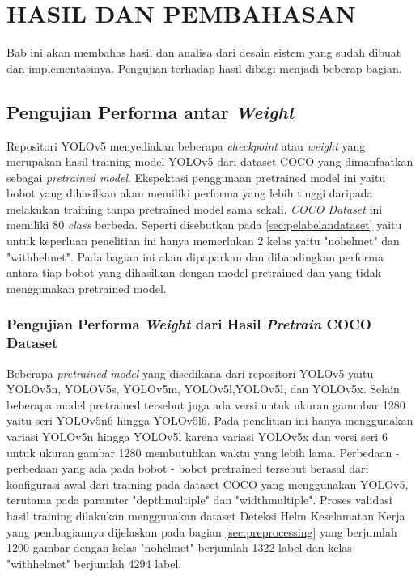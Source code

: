 \chapter{HASIL DAN PEMBAHASAN}
\label{chap:hasilpembahasan}


Bab ini akan membahas hasil dan analisa dari desain sistem yang sudah dibuat dan implementasinya. Pengujian terhadap hasil dibagi menjadi beberap bagian.

\section{Pengujian Performa antar \emph{Weight}}
\label{sec:ujiperforma}
Repositori YOLOv5 menyediakan beberapa \emph{checkpoint} atau \emph{weight} yang merupakan hasil training model YOLOv5 dari dataset COCO yang dimanfaatkan sebagai \emph{pretrained model}. Ekspektasi penggunaan pretrained model ini yaitu bobot yang dihasilkan akan memiliki performa yang lebih tinggi daripada melakukan training tanpa pretrained model sama sekali. \emph{COCO Dataset} ini memiliki 80 \emph{class} berbeda. Seperti disebutkan pada \ref{sec:pelabelandataset} yaitu untuk keperluan penelitian ini hanya memerlukan 2 kelas yaitu "no\textunderscore helmet" dan "with\textunderscore helmet". Pada bagian ini akan dipaparkan dan dibandingkan performa antara tiap bobot yang dihasilkan dengan model pretrained dan yang tidak menggunakan pretrained model.

\subsection{Pengujian Performa \emph{Weight} dari Hasil \emph{Pretrain} COCO Dataset}
\label{subsec:ujiperforma_coco}
Beberapa \emph{pretrained model} yang disedikana dari repositori YOLOv5 yaitu YOLOv5n, YOLOV5s, YOLOv5m, YOLOv5l,YOLOv5l, dan YOLOv5x. Selain beberapa model pretrained tersebut juga ada versi untuk ukuran gammbar 1280 yaitu seri YOLOv5n6 hingga YOLOv5l6. Pada penelitian ini hanya menggunakan variasi YOLOv5n hingga YOLOv5l karena variasi YOLOv5x dan versi seri 6 untuk ukuran gambar 1280 membutuhkan waktu yang lebih lama. Perbedaan - perbedaan yang ada pada bobot - bobot pretrained tersebut berasal dari konfigurasi awal dari training pada dataset COCO yang menggunakan YOLOv5, terutama pada paramter "depth\textunderscore multiple" dan "width\textunderscore multiple".
Proses validasi hasil training dilakukan menggunakan dataset Deteksi Helm Keselamatan Kerja yang pembagiannya dijelaskan pada bagian \ref{sec:preprocessing} yang berjumlah 1200 gambar dengan kelas "no\textunderscore helmet" berjumlah 1322 label dan kelas "with\textunderscore helmet" berjumlah 4294 label.



